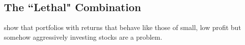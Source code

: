 
\subsection{The ``Lethal" Combination}

\textcite{fama2015five, fama2016choosing, fama2017international} show that portfolios with
returns that behave like those of small, low profit but somehow aggressively investing
stocks are a problem.
